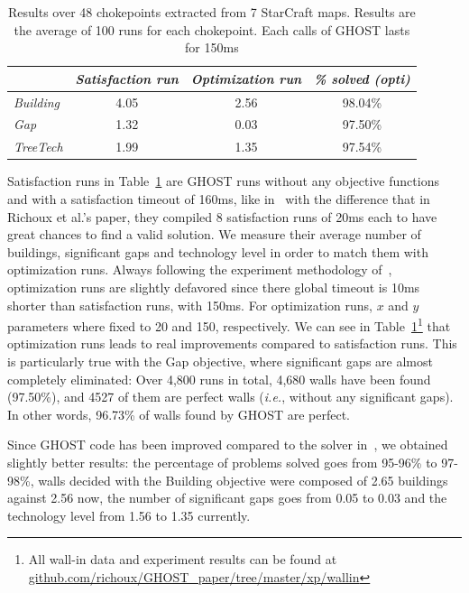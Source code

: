 \documentclass[journal]{IEEEtran}
\newcommand{\ghost}{\textsc{GHOST}\xspace}
\newcommand{\ie}{\textit{i.e.}}
\begin{document}
\begin{table}[ht]
  \caption{Results  over 48  chokepoints  extracted  from 7  StarCraft
    maps. Results  are the  average of 100  runs for  each chokepoint.
    Each calls of \ghost lasts for 150ms} 
    \label{tab:wall}
    \centering
    \begin{tabular}{|l|c|c|c|}
      \cline{2-4}
      \multicolumn{1}{c|}{}   &    {\em   Satisfaction    run}&   {\em
        Optimization run}& {\em \% solved (opti)} \\
      \hline
      {\em Building} & 4.05 & 2.56 & 98.04\% \\
      {\em Gap} & 1.32 & 0.03 & 97.50\% \\ 
      {\em TreeTech} & 1.99 & 1.35 & 97.54\% \\ 
      \hline
    \end{tabular}  
\end{table}
Satisfaction runs in Table~\ref{tab:wall}  are \ghost runs without any
objective functions  and with  a satisfaction  timeout of  160ms, like
in~\cite{RichouxUO14}  with the  difference that  in Richoux  et al.'s
paper, they  compiled 8 satisfaction runs  of 20ms each to  have great
chances to find  a valid solution. We measure their  average number of
buildings, significant  gaps and  technology level  in order  to match
them  with   optimization  runs.   Always  following   the  experiment
methodology  of~\cite{RichouxUO14},  optimization  runs  are  slightly
defavored since there global timeout is 10ms shorter than satisfaction
runs, with 150ms. For optimization  runs, $x$ and $y$ parameters where
fixed   to    20   and   150,    respectively.    We   can    see   in
Table~\ref{tab:wall}\footnote{All wall-in data  and experiment results
  can                   be                  found                   at
  \href{https://github.com/richoux/GHOST\_paper/tree/master/xp/wallin}{github.com/richoux/GHOST\_paper/tree/master/xp/wallin}}
that  optimization  runs  leads   to  real  improvements  compared  to
satisfaction runs. This  is particularly true with  the Gap objective,
where significant  gaps are  almost completely eliminated:  Over 4,800
runs in total, 4,680 walls have been found (97.50\%), and 4527 of them
are perfect walls (\ie, without any significant gaps). In other words,
96.73\% of walls found by \ghost are perfect.

Since  \ghost   code  has  been   improved  compared  to   the  solver
in~\cite{RichouxUO14},  we  obtained   slightly  better  results:  the
percentage  of problems  solved goes  from 95-96\%  to 97-98\%,  walls
decided with  the Building objective  were composed of  2.65 buildings
against 2.56  now, the number  of significant  gaps goes from  0.05 to
0.03 and the technology level from 1.56 to 1.35 currently.
\end{document}
